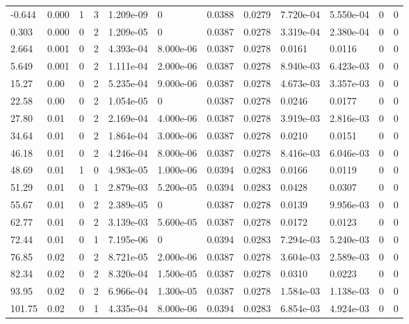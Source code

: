 \documentclass[preview]{standalone}
\begin{document}
{{\begin{tabular}{L{1.2cm}C{1.2cm} C{0.3cm}C{0.5cm} C{1.4cm}C{1.4cm} C{1.4cm}C{1.4cm} C{1.6cm}C{1.6cm} C{1.6cm}C{1.6cm}}
  -0.644  &  0.000  & 1     &  3 &  1.209e-09  & 0  &  0.0388&   0.0279& 7.720e-04 & 5.550e-04   &  0 & 0  \\ 
  0.303  &  0.000  & 0     &  2 &  1.209e-05  & 0  &  0.0387&   0.0278& 3.319e-04 & 2.380e-04   &  0 & 0  \\ 
  2.664  &  0.001  & 0     &  2 &  4.393e-04  & 8.000e-06  &  0.0387&   0.0278& 0.0161 & 0.0116   &  0 & 0  \\ 
  5.649  &  0.001  & 0     &  2 &  1.111e-04  & 2.000e-06  &  0.0387&   0.0278& 8.940e-03 & 6.423e-03   &  0 & 0  \\ 
  15.27  &  0.00  & 0     &  2 &  5.235e-04  & 9.000e-06  &  0.0387&   0.0278& 4.673e-03 & 3.357e-03   &  0 & 0  \\ 
  22.58  &  0.00  & 0     &  2 &  1.054e-05  & 0  &  0.0387&   0.0278& 0.0246 & 0.0177   &  0 & 0  \\ 
  27.80  &  0.01  & 0     &  2 &  2.169e-04  & 4.000e-06  &  0.0387&   0.0278& 3.919e-03 & 2.816e-03   &  0 & 0  \\ 
  34.64  &  0.01  & 0     &  2 &  1.864e-04  & 3.000e-06  &  0.0387&   0.0278& 0.0210 & 0.0151   &  0 & 0  \\ 
  46.18  &  0.01  & 0     &  2 &  4.246e-04  & 8.000e-06  &  0.0387&   0.0278& 8.416e-03 & 6.046e-03   &  0 & 0  \\ 
  48.69  &  0.01  & 1     &  0 &  4.983e-05  & 1.000e-06  &  0.0394&   0.0283& 0.0166 & 0.0119   &  0 & 0  \\ 
  51.29  &  0.01  & 0     &  1 &  2.879e-03  & 5.200e-05  &  0.0394&   0.0283& 0.0428 & 0.0307   &  0 & 0  \\ 
  55.67  &  0.01  & 0     &  2 &  2.389e-05  & 0  &  0.0387&   0.0278& 0.0139 & 9.956e-03   &  0 & 0  \\ 
  62.77  &  0.01  & 0     &  2 &  3.139e-03  & 5.600e-05  &  0.0387&   0.0278& 0.0172 & 0.0123   &  0 & 0  \\ 
  72.44  &  0.01  & 0     &  1 &  7.195e-06  & 0  &  0.0394&   0.0283& 7.294e-03 & 5.240e-03   &  0 & 0  \\ 
  76.85  &  0.02  & 0     &  2 &  8.721e-05  & 2.000e-06  &  0.0387&   0.0278& 3.604e-03 & 2.589e-03   &  0 & 0  \\ 
  82.34  &  0.02  & 0     &  2 &  8.320e-04  & 1.500e-05  &  0.0387&   0.0278& 0.0310 & 0.0223   &  0 & 0  \\ 
  93.95  &  0.02  & 0     &  2 &  6.966e-04  & 1.300e-05  &  0.0387&   0.0278& 1.584e-03 & 1.138e-03   &  0 & 0  \\ 
  101.75  &  0.02  & 0     &  1 &  4.335e-04  & 8.000e-06  &  0.0394&   0.0283& 6.854e-03 & 4.924e-03   &  0 & 0  \\ 

\end{tabular}}}
\end{document}
